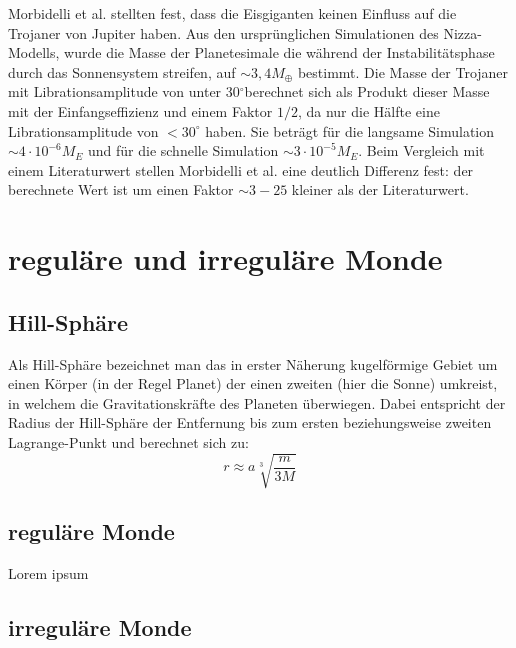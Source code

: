 \documentclass[10pt,a4paper,twoside]{article}
\newcommand{\degree}{$^\circ$}
\begin{document}
Morbidelli et al. stellten fest, dass die Eisgiganten keinen Einfluss auf die Trojaner von Jupiter haben.
Aus den ursprünglichen Simulationen des Nizza-Modells, %
wurde die Masse der Planetesimale die während der Instabilitätsphase durch das Sonnensystem streifen, auf $\sim 3,4 M_\oplus$ bestimmt.
Die Masse der Trojaner mit Librationsamplitude von unter 30\degree berechnet sich als Produkt dieser Masse mit der Einfangseffizienz und einem Faktor $1/2$, da nur die Hälfte eine Librationsamplitude von $<30^\circ$ haben. Sie beträgt für die langsame Simulation $\sim4\cdot 10^{-6} M_E$ und für die schnelle Simulation $\sim 3\cdot 10^{-5}M_E$.
Beim Vergleich mit einem Literaturwert stellen Morbidelli et al. eine deutlich Differenz fest: der berechnete Wert ist um einen Faktor $\sim3-25$ kleiner als der Literaturwert.


\FloatBarrier
\section{reguläre und irreguläre Monde}\label{Monde}
\subsection{Hill-Sphäre}
Als Hill-Sphäre bezeichnet man das in erster Näherung kugelförmige Gebiet um einen Körper (in der Regel Planet) der einen zweiten (hier die Sonne) umkreist, in welchem die Gravitationskräfte des Planeten überwiegen. Dabei entspricht der Radius der Hill-Sphäre der Entfernung bis zum ersten beziehungsweise zweiten Lagrange-Punkt und berechnet sich zu\cite{Sheppard2005}:
\begin{equation}
r \approx a \sqrt[3]{\frac{m}{3 M}}
\end{equation}

\subsection{reguläre Monde}
Lorem ipsum

\subsection{irreguläre Monde}
\end{document}
